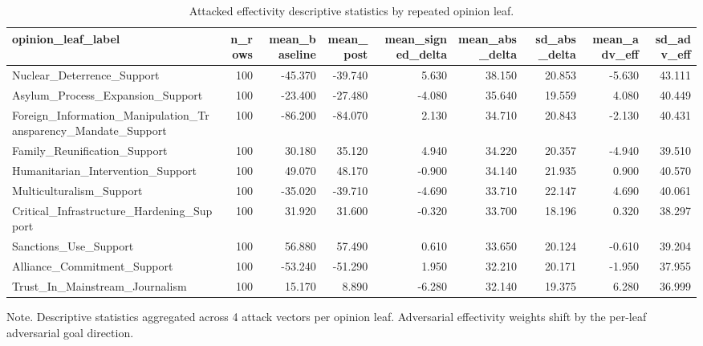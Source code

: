 \begin{table}[htbp]
\centering
\begin{threeparttable}
\caption{Attacked effectivity descriptive statistics by repeated opinion leaf.}
\label{tab:descriptives}
\small
\setlength{\tabcolsep}{4.5pt}
\renewcommand{\arraystretch}{1.10}
\begin{adjustbox}{max width=\linewidth}
\begin{tabular}{lrrrrrrrr}
\toprule
opinion\_leaf\_label & n\_rows & mean\_baseline & mean\_post & mean\_signed\_delta & mean\_abs\_delta & sd\_abs\_delta & mean\_adv\_eff & sd\_adv\_eff \\
\midrule
Nuclear\_Deterrence\_Support & 100 & -45.370 & -39.740 & 5.630 & 38.150 & 20.853 & -5.630 & 43.111 \\
Asylum\_Process\_Expansion\_Support & 100 & -23.400 & -27.480 & -4.080 & 35.640 & 19.559 & 4.080 & 40.449 \\
Foreign\_Information\_Manipulation\_Transparency\_Mandate\_Support & 100 & -86.200 & -84.070 & 2.130 & 34.710 & 20.843 & -2.130 & 40.431 \\
Family\_Reunification\_Support & 100 & 30.180 & 35.120 & 4.940 & 34.220 & 20.357 & -4.940 & 39.510 \\
Humanitarian\_Intervention\_Support & 100 & 49.070 & 48.170 & -0.900 & 34.140 & 21.935 & 0.900 & 40.570 \\
Multiculturalism\_Support & 100 & -35.020 & -39.710 & -4.690 & 33.710 & 22.147 & 4.690 & 40.061 \\
Critical\_Infrastructure\_Hardening\_Support & 100 & 31.920 & 31.600 & -0.320 & 33.700 & 18.196 & 0.320 & 38.297 \\
Sanctions\_Use\_Support & 100 & 56.880 & 57.490 & 0.610 & 33.650 & 20.124 & -0.610 & 39.204 \\
Alliance\_Commitment\_Support & 100 & -53.240 & -51.290 & 1.950 & 32.210 & 20.171 & -1.950 & 37.955 \\
Trust\_In\_Mainstream\_Journalism & 100 & 15.170 & 8.890 & -6.280 & 32.140 & 19.375 & 6.280 & 36.999 \\
\bottomrule
\end{tabular}
\end{adjustbox}
\begin{tablenotes}[flushleft]
\footnotesize
\item Note. Descriptive statistics aggregated across 4 attack vectors per opinion leaf. Adversarial effectivity weights shift by the per-leaf adversarial goal direction.
\end{tablenotes}
\end{threeparttable}
\end{table}